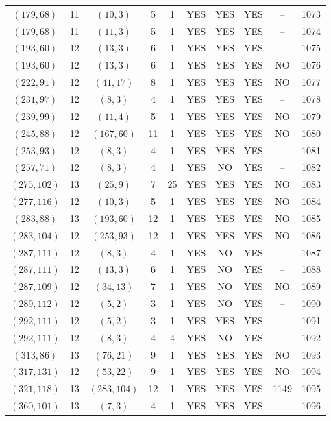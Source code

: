 \begin{longtable}{|c|c|c|c|c|c|c|c|c|c|}
$(179, 68)$ & 11 & $(10, 3)$ & 5 & 1 & YES & YES & YES & -- & 1073\\
$(179, 68)$ & 11 & $(11, 3)$ & 5 & 1 & YES & YES & YES & -- & 1074\\
$(193, 60)$ & 12 & $(13, 3)$ & 6 & 1 & YES & YES & YES & -- & 1075\\
$(193, 60)$ & 12 & $(13, 3)$ & 6 & 1 & YES & YES & YES & NO & 1076\\
$(222, 91)$ & 12 & $(41, 17)$ & 8 & 1 & YES & YES & YES & NO & 1077\\
$(231, 97)$ & 12 & $(8, 3)$ & 4 & 1 & YES & YES & YES & -- & 1078\\
$(239, 99)$ & 12 & $(11, 4)$ & 5 & 1 & YES & YES & YES & NO & 1079\\
$(245, 88)$ & 12 & $(167, 60)$ & 11 & 1 & YES & YES & YES & NO & 1080\\
$(253, 93)$ & 12 & $(8, 3)$ & 4 & 1 & YES & YES & YES & -- & 1081\\
$(257, 71)$ & 12 & $(8, 3)$ & 4 & 1 & YES & NO & YES & -- & 1082\\
$(275, 102)$ & 13 & $(25, 9)$ & 7 & 25 & YES & YES & YES & NO & 1083\\
$(277, 116)$ & 12 & $(10, 3)$ & 5 & 1 & YES & YES & YES & NO & 1084\\
$(283, 88)$ & 13 & $(193, 60)$ & 12 & 1 & YES & YES & YES & NO & 1085\\
$(283, 104)$ & 12 & $(253, 93)$ & 12 & 1 & YES & YES & YES & NO & 1086\\
$(287, 111)$ & 12 & $(8, 3)$ & 4 & 1 & YES & NO & YES & -- & 1087\\
$(287, 111)$ & 12 & $(13, 3)$ & 6 & 1 & YES & NO & YES & -- & 1088\\
$(287, 109)$ & 12 & $(34, 13)$ & 7 & 1 & YES & NO & YES & NO & 1089\\
$(289, 112)$ & 12 & $(5, 2)$ & 3 & 1 & YES & NO & YES & -- & 1090\\
$(292, 111)$ & 12 & $(5, 2)$ & 3 & 1 & YES & YES & YES & -- & 1091\\
$(292, 111)$ & 12 & $(8, 3)$ & 4 & 4 & YES & NO & YES & -- & 1092\\
$(313, 86)$ & 13 & $(76, 21)$ & 9 & 1 & YES & YES & YES & NO & 1093\\
$(317, 131)$ & 12 & $(53, 22)$ & 9 & 1 & YES & YES & YES & NO & 1094\\
$(321, 118)$ & 13 & $(283, 104)$ & 12 & 1 & YES & YES & YES & 1149 & 1095\\
$(360, 101)$ & 13 & $(7, 3)$ & 4 & 1 & YES & YES & YES & -- & 1096\\

\end{longtable}
